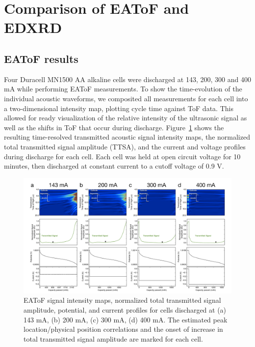 \section{Comparison of EAToF and EDXRD}
\subsection{EAToF results}
Four Duracell MN1500 AA alkaline cells were discharged at 143, 200, 300 and 400 mA while performing EAToF measurements. To show the time-evolution of the individual acoustic waveforms, we composited all measurements for each cell into a two-dimensional intensity map, plotting cycle time against ToF data. This allowed for ready visualization of the relative intensity of the ultrasonic signal as well as the shifts in ToF that occur during discharge. Figure~\ref{fig:alkbwrates} shows the resulting time-resolved transmitted acoustic signal intensity maps, the normalized total transmitted signal amplitude (TTSA), and the current and voltage profiles during discharge for each cell. Each cell was held at open circuit voltage for 10 minutes, then discharged at constant current to a cutoff voltage of 0.9 V.

\begin{figure}[htb]
  \centering
    \includegraphics[width=1.00\textwidth]{ch5-alkbw/images/Fig1_v2.png}
    \caption[EAToF results for alkaline AA cells discharged at multiple rates.]{EAToF signal intensity maps, normalized total transmitted signal amplitude, potential, and current profiles for cells discharged at (a) 143 mA, (b) 200 mA, (c) 300 mA, (d) 400 mA. The estimated peak location/physical position correlations and the onset of increase in total transmitted signal amplitude are marked for each cell.}
    \label{fig:alkbwrates}
\end{figure}

